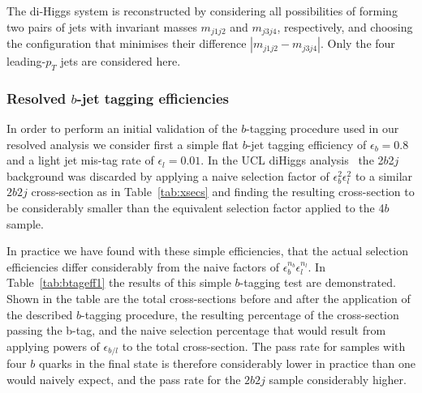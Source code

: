 \documentclass[12pt]{article}
\begin{document}
The di-Higgs system is reconstructed by considering all possibilities of forming two pairs of jets with invariant masses $m_{j1j2}$ and 
$m_{j3j4}$, respectively, and choosing the configuration that minimises their difference $|m_{j1j2} - m_{j3j4}|$. Only the four leading-$p_T$ jets
are considered here.

\subsubsection{Resolved $b$-jet tagging efficiencies} \label{sec:btagtest}
In order to perform an initial validation of the $b$-tagging procedure used in our resolved analysis we consider first a simple flat $b$-jet tagging efficiency of $\epsilon_b=0.8$ and a light jet mis-tag rate of $\epsilon_l=0.01$. In the UCL diHiggs analysis~\cite{Wardrope:2014kya} the 2$b$2$j$ background was discarded by applying a naive selection factor of $\epsilon^2_b\epsilon^2_l$ to a similar $2b2j$ cross-section as in Table~\ref{tab:xsecs} and finding the resulting cross-section to be considerably smaller than the equivalent selection factor applied to the 4$b$ sample.

In practice we have found with these simple efficiencies, that the actual selection efficiencies differ considerably from the naive factors of $\epsilon_b^{n_b}\epsilon_l^{n_l}$.
In Table~\ref{tab:btageff1} the results of this simple $b$-tagging test are demonstrated. Shown in the table are the total cross-sections before and after the application of the described $b$-tagging procedure, the resulting percentage of the cross-section passing the b-tag, and the naive selection percentage that would result from applying powers of $\epsilon_{b/l}$ to the total cross-section. The pass rate for samples with four $b$ quarks in the final state is therefore considerably lower in practice than one would naively expect, and the pass rate for the $2b2j$ sample considerably higher.
\end{document}
